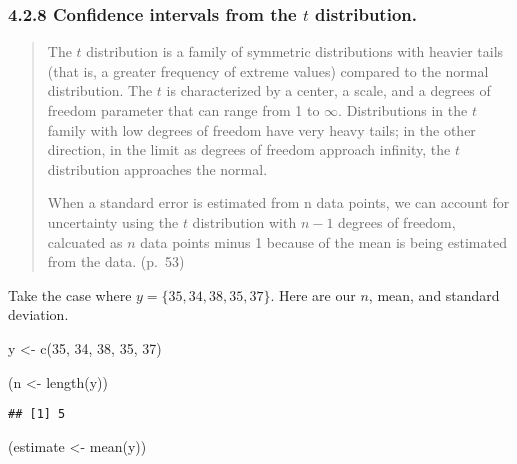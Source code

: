 \documentclass[
]{article}
\newenvironment{Shaded}{\begin{snugshade}}{\end{snugshade}}
\newcommand{\DecValTok}[1]{\textcolor[rgb]{0.00,0.00,0.81}{#1}}
\newcommand{\FunctionTok}[1]{\textcolor[rgb]{0.00,0.00,0.00}{#1}}
\newcommand{\NormalTok}[1]{#1}
\newcommand{\OtherTok}[1]{\textcolor[rgb]{0.56,0.35,0.01}{#1}}
\begin{document}
\hypertarget{confidence-intervals-from-the-t-distribution.}{%
\subsubsection{\texorpdfstring{4.2.8 Confidence intervals from the \(t\)
distribution.}{4.2.8 Confidence intervals from the t distribution.}}\label{confidence-intervals-from-the-t-distribution.}}

\begin{quote}
The \(t\) distribution is a family of symmetric distributions with
heavier tails (that is, a greater frequency of extreme values) compared
to the normal distribution. The \(t\) is characterized by a center, a
scale, and a degrees of freedom parameter that can range from 1 to
\(\infty\). Distributions in the \(t\) family with low degrees of
freedom have very heavy tails; in the other direction, in the limit as
degrees of freedom approach infinity, the \(t\) distribution approaches
the normal.

When a standard error is estimated from n data points, we can account
for uncertainty using the \(t\) distribution with \(n - 1\) degrees of
freedom, calcuated as \(n\) data points minus 1 because of the mean is
being estimated from the data. (p.~53)
\end{quote}

Take the case where \(y = \{35, 34, 38, 35, 37 \}\). Here are our \(n\),
mean, and standard deviation.

\begin{Shaded}
\begin{Highlighting}[]
\NormalTok{y }\OtherTok{\textless{}{-}} \FunctionTok{c}\NormalTok{(}\DecValTok{35}\NormalTok{, }\DecValTok{34}\NormalTok{, }\DecValTok{38}\NormalTok{, }\DecValTok{35}\NormalTok{, }\DecValTok{37}\NormalTok{)}

\NormalTok{(n }\OtherTok{\textless{}{-}} \FunctionTok{length}\NormalTok{(y))}
\end{Highlighting}
\end{Shaded}

\begin{verbatim}
## [1] 5
\end{verbatim}

\begin{Shaded}
\begin{Highlighting}[]
\NormalTok{(estimate }\OtherTok{\textless{}{-}} \FunctionTok{mean}\NormalTok{(y))}
\end{Highlighting}
\end{Shaded}
\end{document}
